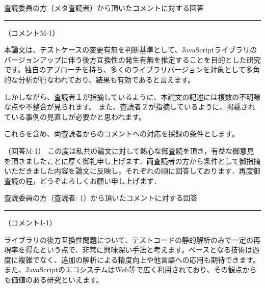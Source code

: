\documentclass{jarticle} %
\def\section#1{ \vspace{3pc} {\large \gt #1} \vspace{1pc} \hrule }
\def\subsection#1{ \vspace{1pc} {\gt #1} }
\begin{document}
\section{査読委員の方（メタ査読者）から頂いたコメントに対する回答}

\subsection{（コメントM-1）}

本論文は、テストケースの変更有無を判断基準として、JavaScriptライブラリのバージョンアップに伴う後方互換性の発生有無を推定することを目的とした研究です。独自のアプローチを持ち、多くのライブラリバージョンを対象として多角的な分析が行なわれており、結果も有効であると言えます。

しかしながら、査読者１が指摘しているように、本論文の記述には複数の不明瞭な点や不整合が見られます。
また、査読者２が指摘しているように、掲載されている事例の見直しが必要かと思われます。

これらを含め、両査読者からのコメントへの対応を採録の条件とします。


\subsection{（回答M-1）}
この度は私共の論文に対して熱心な御査読を頂き，有益な御意見を頂きましたことに厚く御礼申し上げます．両査読者の方から条件として御指摘いただきました内容を論文に反映し，それぞれの順に回答しております．再度御査読の程，どうぞよろしくお願い申し上げます．


\newpage
\section{査読委員の方（査読者: 1）から頂いたコメントに対する回答}
\subsection{（コメント1-1）}

ライブラリの後方互換性問題について、テストコードの静的解析のみで一定の再現率を得たという点で、非常に興味深い手法と考えます。ベースとなる技術は過度に複雑でなく、追加の解析による精度向上や他言語への応用も期待できます。
また、JavaScriptのエコシステムはWeb等で広く利用されており、その観点からも価値のある研究といえます。
\end{document}

